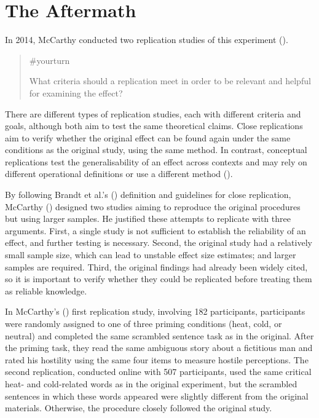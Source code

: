 \documentclass[
  letterpaper,
]{book}
\begin{document}
\section{The Aftermath}\label{the-aftermath-22}

In 2014, McCarthy conducted two replication studies of this experiment
().

\begin{quote}
{\#yourturn}

What criteria should a replication meet in order to be relevant and
helpful for examining the effect?
\end{quote}

There are different types of replication studies, each with different
criteria and goals, although both aim to test the same theoretical
claims. Close replications aim to verify whether the original effect can
be found again under the same conditions as the original study, using
the same method. In contrast, conceptual replications test the
generalisability of an effect across contexts and may rely on different
operational definitions or use a different method
().

By following Brandt et al.'s
() definition and guidelines
for close replication, McCarthy
() designed two studies aiming
to reproduce the original procedures but using larger samples. He
justified these attempts to replicate with three arguments. First, a
single study is not sufficient to establish the reliability of an
effect, and further testing is necessary. Second, the original study had
a relatively small sample size, which can lead to unstable effect size
estimates; and larger samples are required. Third, the original findings
had already been widely cited, so it is important to verify whether they
could be replicated before treating them as reliable knowledge.

In McCarthy's () first
replication study, involving 182 participants, participants were
randomly assigned to one of three priming conditions (heat, cold, or
neutral) and completed the same scrambled sentence task as in the
original. After the priming task, they read the same ambiguous story
about a fictitious man and rated his hostility using the same four items
to measure hostile perceptions. The second replication, conducted online
with 507 participants, used the same critical heat- and cold-related
words as in the original experiment, but the scrambled sentences in
which these words appeared were slightly different from the original
materials. Otherwise, the procedure closely followed the original study.
\end{document}
